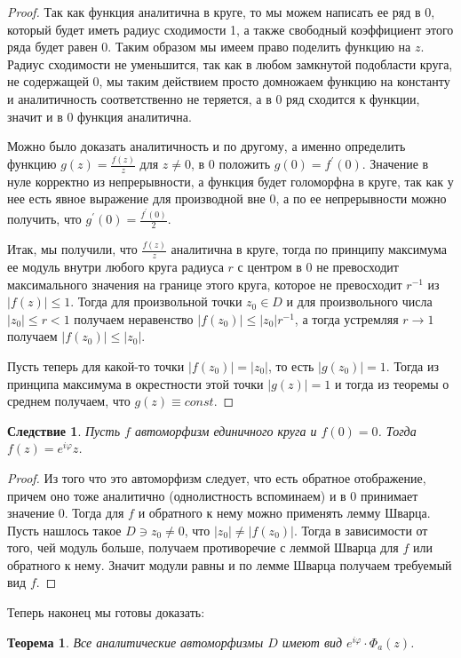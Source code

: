 \documentclass[12pt,a4paper]{article} %
\newtheorem{theorem}{Теорема}
\newtheorem{consequence}{Следствие}
\begin{document}
	\begin{proof}
		Так как функция аналитична в круге, то мы можем написать ее ряд в 0, который будет иметь радиус сходимости 1, а также свободный коэффициент этого ряда будет равен 0. Таким образом мы имеем право поделить функцию на $z$. Радиус сходимости не уменьшится, так как в любом замкнутой подобласти круга, не содержащей 0, мы таким действием просто домножаем функцию на константу и аналитичность соответственно не теряется, а в 0 ряд сходится к функции, значит и в 0 функция аналитична.
		
		Можно было доказать аналитичность и по другому, а именно определить функцию $g(z)=\frac{f(z)}{z}$ для $z\neq 0$, в 0 положить $g(0)=f^{'}(0)$. Значение в нуле корректно из непрерывности, а функция будет голоморфна в круге, так как у нее есть явное выражение для производной вне 0, а по ее непрерывности можно получить, что $g^{'}(0)=\frac{f^{'}(0)}{2}$.
		
		Итак, мы получили, что $\frac{f(z)}{z}$ аналитична в круге, тогда по принципу максимума ее модуль внутри любого круга радиуса $r$ с центром в 0 не превосходит максимального значения на границе этого круга, которое не превосходит $r^{-1}$ из $|f(z)|\leq 1$. Тогда для произвольной точки $z_0\in D$ и для произвольного числа $|z_0|\leq r<1$ получаем неравенство $|f(z_0)|\leq |z_0|r^{-1}$, а тогда устремляя $r\rightarrow 1$ получаем $|f(z_0)|\leq |z_0|$.
		
		Пусть теперь для какой-то точки $|f(z_0)|=|z_0|$, то есть $|g(z_0)|=1$. Тогда из принципа максимума в окрестности этой точки $|g(z)|=1$ и тогда из теоремы о среднем получаем, что $g(z)\equiv const$.
	\end{proof}
	\begin{consequence}
		Пусть $f$ автоморфизм единичного круга и $f(0)=0$. Тогда $f(z)=e^{i\varphi}z$.
	\end{consequence}
	\begin{proof}
		Из того что это автоморфизм следует, что есть обратное отображение, причем оно тоже аналитично (однолистность вспоминаем) и в 0 принимает значение 0. Тогда для $f$ и обратного к нему можно применять лемму Шварца. Пусть нашлось такое $D\ni z_0\neq 0$, что $|z_0|\neq |f(z_0)|$. Тогда в зависимости от того, чей модуль больше, получаем противоречие с леммой Шварца для $f$ или обратного к нему. Значит модули равны и по лемме Шварца получаем требуемый вид $f$.
	\end{proof}
	Теперь наконец мы готовы доказать:
	\begin{theorem}
		Все аналитические автоморфизмы $D$ имеют вид $e^{i\varphi}\cdot\Phi_a(z)$.
	\end{theorem}
\end{document}

